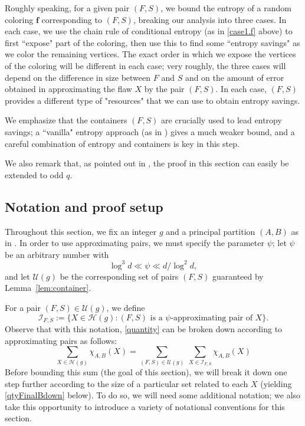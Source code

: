 \documentclass{amsart}
\theoremstyle{definition}
\newcommand{\cH}{\mathcal{H} }
\newcommand{\cI}{\mathcal{I} }
\newcommand{\cU}{\mathcal{U} }
\newcommand{\beq}[1]{\begin{equation}\label{#1}}
\newcommand{\enq}[0]{\end{equation}}
\newcommand{\0}[0]{\emptyset}
\begin{document}
Roughly speaking, for a given pair $(F,S)$, we bound the entropy of a random coloring $\mathbf{f}$ corresponding to $(F,S)$, breaking our analysis into three cases. In each case, we use the chain rule of conditional entropy (as in \eqref{case1.f} above) to first ``expose" part of the coloring, then use this to find some ``entropy savings" as we color the remaining vertices. The exact order in which we expose the vertices of the coloring will be different in each case; very roughly, the three cases will depend on the difference in size between $F$ and $S$ and on the amount of error obtained in approximating the flaw $X$ by the pair $(F,S)$. In each case, $(F,S)$ provides a different type of "resources" that we can use to obtain entropy savings. 

We emphasize that the containers $(F,S)$ are crucially used to lead entropy savings; a ``vanilla" entropy approach (as in ) gives a much weaker bound, and a careful combination of entropy and containers is key in this step.


We also remark that, as pointed out in , the proof in this section can easily be extended to odd $q$.



\subsection{Notation and proof setup}

Throughout this section, we fix an integer $g$ and a principal partition $(A,B)$ as in . In order to use approximating pairs, we must specify the parameter $\psi$; let $\psi$ be an arbitrary number with
\beq{psi.bd} \log^3 d \ll \psi \ll d/\log^2 d,\enq 
and let $\cU(g)$ be the corresponding set of pairs $(F,S)$ guaranteed by Lemma~\ref{lem:container}. 

For a pair $(F, S)\in \cU(g)$, we define 
\[
\mathcal{I}_{F, S}:=\{X\in\cH(g): \mbox{$(F,S)$ is a $\psi$-approximating pair of $X$}\}.
\]
Observe that with this notation, \eqref{quantity} can be broken down according to approximating pairs as follows:
\beq{qtyBreakdown}
	\sum_{X \in \cH(g)} \chi_{A,B}(X) = \sum_{(F,S)\in\cU(g)}\ \sum_{X\in \cI_{F,S}} \chi_{A,B}(X)
\enq
Before bounding this sum (the goal of this section), we will break it down one step further  according to the size of a particular set related to each $X$ (yielding \eqref{qtyFinalBdown} below). To do so, we will need some additional notation; we also take this opportunity to introduce a variety of notational conventions for this section.
\end{document}
